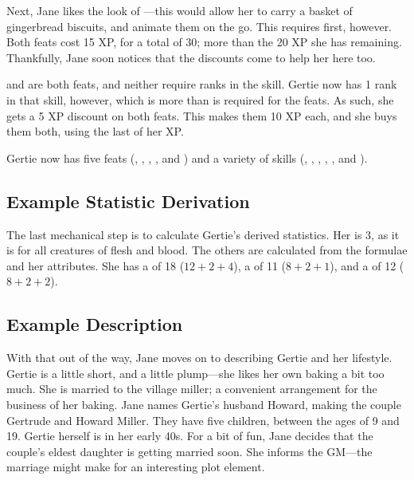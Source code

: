 Next, Jane likes the look of ---this would allow her to carry a basket of gingerbread biscuits, and animate them on the go.
This requires  first, however.
Both feats cost 15 XP, for a total of 30; more than the 20 XP she has remaining.
Thankfully, Jane soon notices that the discounts come to help her here too.

 and  are both  feats, and neither require ranks in the  skill.
Gertie now has 1 rank in that skill, however, which is more than is required for the feats.
As such, she gets a 5 XP discount on both feats.
This makes them 10 XP each, and she buys them both, using the last of her XP.

Gertie now has five feats (, , , , and ) and a variety of skills (, , , , , and ).

\subsection{Example Statistic Derivation}

The last mechanical step is to calculate Gertie's derived statistics.
Her  is 3, as it is for all creatures of flesh and blood.
The others are calculated from the formulae and her attributes.
She has a  of 18 ($12+2+4$), a  of 11 ($8+2+1$), and a  of 12 ($8+2+2$).

\subsection{Example Description}

With that out of the way, Jane moves on to describing Gertie and her lifestyle.
Gertie is a little short, and a little plump---she likes her own baking a bit too much.
She is married to the village miller; a convenient arrangement for the business of her baking.
Jane names Gertie's husband Howard, making the couple Gertrude and Howard Miller.
They have five children, between the ages of 9 and 19.
Gertie herself is in her early 40s.
For a bit of fun, Jane decides that the couple's eldest daughter is getting married soon.
She informs the GM---the marriage might make for an interesting plot element.

